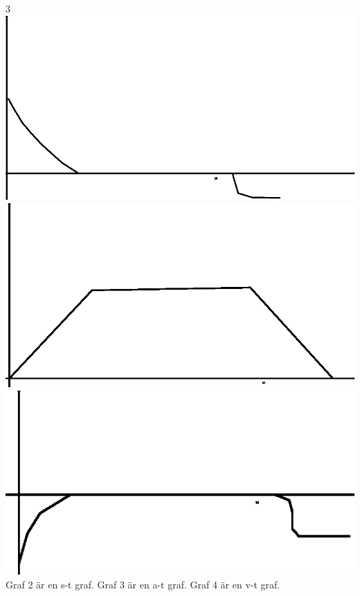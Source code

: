 \documentclass[a4paper,11pt]{article}
\begin{document}
\begin{flushleft}
\begin{enumerate}
  3\newline
  \includegraphics{spring3.eps}\newline
  \includegraphics{spring4.eps}\newline
  \includegraphics{spring5.eps}\newline
  Graf 2 är en s-t graf.\newline
  Graf 3 är en a-t graf.\newline
  Graf 4 är en v-t graf.\newline

\end{enumerate}
\end{flushleft}
\end{document}
